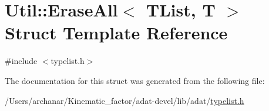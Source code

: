 \hypertarget{structUtil_1_1TL_1_1EraseAll}{}\section{Util\+:\+:Erase\+All$<$ T\+List, T $>$ Struct Template Reference}
\label{structUtil_1_1TL_1_1EraseAll}


{\ttfamily \#include $<$typelist.\+h$>$}



The documentation for this struct was generated from the following file\+:\begin{DoxyCompactItemize}
\item 
/\+Users/archanar/\+Kinematic\+\_\+factor/adat-\/devel/lib/adat/\mbox{\hyperlink{adat-devel_2lib_2adat_2typelist_8h}{typelist.\+h}}\end{DoxyCompactItemize}
